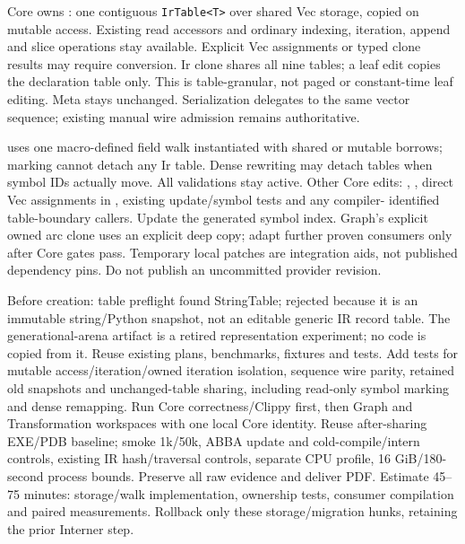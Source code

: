 \documentclass[11pt,a4paper]{article}
\begin{document}
Core owns : one contiguous \texttt{IrTable<T>} over shared Vec
storage, copied on mutable access. Existing read accessors and ordinary indexing,
iteration, append and slice operations stay available. Explicit Vec assignments
or typed clone results may require conversion. Ir clone shares all nine tables;
a leaf edit copies the declaration table only. This is table-granular, not paged
or constant-time leaf editing. Meta stays unchanged. Serialization delegates to
the same vector sequence; existing manual wire admission remains authoritative.

 uses one macro-defined field walk instantiated with
shared or mutable borrows; marking cannot detach any Ir table. Dense rewriting
may detach tables when symbol IDs actually move. All validations stay active.
Other Core edits: , , direct Vec assignments in
, existing update/symbol tests and any compiler-
identified table-boundary callers. Update the generated symbol index. Graph's
explicit owned arc clone uses an explicit deep copy; adapt further proven consumers
only after Core gates pass. Temporary local patches are integration aids, not
published dependency pins. Do not publish an uncommitted provider revision.

Before creation: table preflight found StringTable; rejected because it is an
immutable string/Python snapshot, not an editable generic IR record table.
The generational-arena artifact is a retired representation experiment; no code
is copied from it. Reuse existing plans, benchmarks, fixtures and tests.
Add tests for mutable access/iteration/owned iteration isolation, sequence wire
parity, retained old snapshots and unchanged-table sharing, including read-only
symbol marking and dense remapping. Run Core correctness/Clippy first, then Graph
and Transformation workspaces with one local Core identity. Reuse after-sharing
EXE/PDB baseline; smoke 1k/50k, ABBA update and cold-compile/intern controls, existing
IR hash/traversal controls, separate CPU profile, 16 GiB/180-second process bounds.
Preserve all raw evidence and deliver PDF. Estimate 45--75 minutes: storage/walk
implementation, ownership tests, consumer compilation and paired measurements.
Rollback only these storage/migration hunks, retaining the prior Interner step.
\end{document}

